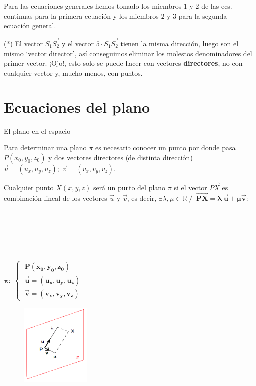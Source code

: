 \begin{proofw}
\textcolor{gris}{Para las ecuaciones generales hemos tomado los miembros $1$ y $2$ de las ecs. continuas para la primera ecuación y los miembros $2$ y $3$ para la segunda ecuación general}\normalsize{.}

(*) El vector $\overrightarrow{S_1S_2}$ y el vector $5\cdot \overrightarrow{S_1S_2}$ tienen la misma dirección, luego son el mismo `vector director', así conseguimos eliminar los molestos denominadores del primer vector. ¡Ojo!, esto solo se puede hacer con vectores \textbf{directores}, no con cualquier vector y, mucho menos, con puntos.

\end{proofw}



\section{Ecuaciones del plano}

\begin{myblock}{El plano en el espacio}
	
Para determinar una plano $\pi$ es necesario conocer un punto por donde pasa $P(x_0,y_0,z_0)$ y dos vectores directores (de distinta dirección) $\vec u=(u_x,u_y,u_z); \; \vec v=(v_x,v_y,v_z)$.

\vspace{2mm}Cualquier punto $X(x,y,z)$ será un punto del plano $\pi$ si el vector $\overrightarrow {PX}$ es combinación lineal de los vectores $\vec u \text{ y } \vec v$, es decir, $  \exists \lambda, \mu \in \mathbb R\;/ \;\; \boldsymbol{\overrightarrow {PX}=\lambda \; \vec u + \mu \vec v}$:

\begin{multicols}{2}

$\quad$

$\quad$

$\quad$
\centerline{$\boldsymbol{\pi:\; \begin{cases} \;P(x_0,y_0,z_0)\\ \;\vec u=(u_x,u_y,u_z) \\ \; \vec v=(v_x,v_y,v_z) \end{cases}}$}

	\begin{figure}[H]
		\centering
		\includegraphics[width=0.3\textwidth]{imagenes/imagenes10/T10IM02.png}
	\end{figure}
\end{multicols}
\end{myblock}

